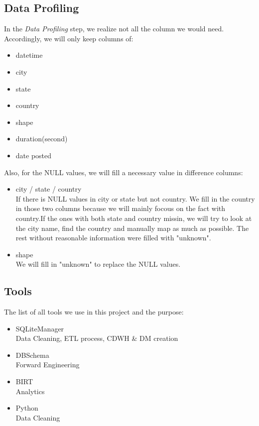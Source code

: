 \documentclass[11pt, journal]{IEEEtran}
\begin{document}
\subsection{Data Profiling}\label{subsec:dataProfiling}
In the \emph{Data Profiling} step, we realize not all the column we would need. Accordingly, we will only keep columns of:
\begin{itemize}
    \item datetime
    \item city
    \item state
    \item country
    \item shape
    \item duration(second)
    \item date posted
\end{itemize}
Also, for the NULL values, we will fill a necessary value in difference columns:
\begin{itemize}
    \item city / state / country\\
    If there is NULL values in city or state but not country. We fill in the country in those two columns because we will mainly focous on the fact with country.If the ones with both state and country missin, we will try to look at the city name, find the country and manually map as much as possible. The rest without reasonable information were filled with "unknown".
    \item shape\\
    We will fill in "unknown" to replace the NULL values.
\end{itemize}

\subsection{Tools}\label{subsec:tools}
The list of all tools we use in this project and the purpose:  
\begin{itemize}
    \item SQLiteManager\\
    Data Cleaning, ETL process, CDWH \& DM creation
    \item DBSchema\\
    Forward Engineering
    \item BIRT\\
    Analytics
    \item Python\\
    Data Cleaning
\end{itemize}
    
\end{document}
